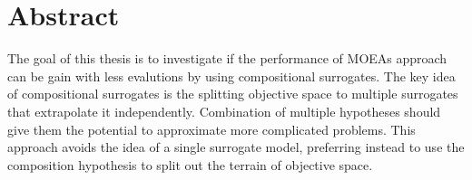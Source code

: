 \section{Abstract}

The goal of this thesis is to investigate if the performance of MOEAs approach can be gain with less evalutions by using compositional surrogates. The key idea of compositional surrogates is the splitting objective space to multiple surrogates that extrapolate it independently. Combination of multiple hypotheses should give them the potential to approximate more complicated problems. This approach avoids the idea of a single surrogate model, preferring instead to use the composition hypothesis to split out the terrain of objective space.